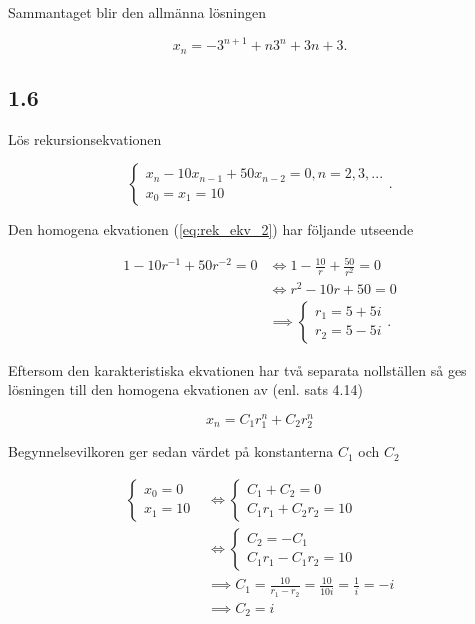 \documentclass[a4paper]{article}
\begin{document}
Sammantaget blir den allmänna lösningen

\begin{equation*}
	x_n = -3^{n+1} + n3^n + 3n + 3.
\end{equation*}

\subsection*{1.6}

Lös rekursionsekvationen

\begin{equation}
	\begin{cases}
		x_{n} - 10x_{n-1} + 50x_{n-2} = 0, n = 2,3,...\\
		x_0 = x_1 = 10
	\end{cases}\label{eq:rek_ekv_2}.
\end{equation}

Den homogena ekvationen (\ref{eq:rek_ekv_2}) har följande utseende

\begin{align*}
	1 - 10r^{-1} + 50r^{-2} = 0 &\iff 1 - \frac{10}{r} + \frac{50}{r^2} = 0\\
								&\iff r^2 - 10r + 50 = 0\\
								&\implies	\begin{cases}
												r_1 = 5 + 5i\\
												r_2 = 5 - 5i
											\end{cases}.
\end{align*}

Eftersom den karakteristiska ekvationen har två separata nollställen så ges lösningen till den homogena ekvationen av (enl. sats 4.14)

\begin{equation*}
	x_n = C_1r_1^n + C_2r_2^n
\end{equation*}
	
Begynnelsevilkoren ger sedan värdet på konstanterna $C_1$ och $C_2$

\begin{align*}
	\begin{cases}
		x_0 = 0\\
		x_1 = 10
	\end{cases}
	&\iff
	\begin{cases}
		C_1 + C_2 = 0\\
		C_1r_1 + C_2r_2 = 10
	\end{cases}\\
	&\iff
	\begin{cases}
		C_2 = -C_1\\
		C_1r_1 - C_1r_2 = 10
	\end{cases}\\
	&\implies C_1 = \frac{10}{r_1 - r_2} = \frac{10}{10i} = \frac{1}{i} = -i\\
	&\implies C_2 = i
\end{align*}
\end{document}
